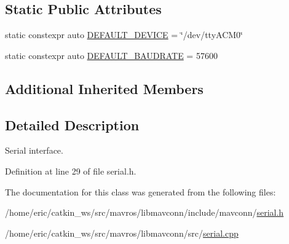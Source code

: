 \subsection*{Static Public Attributes}
\begin{DoxyCompactItemize}
\item 
static constexpr auto \mbox{\hyperlink{group__mavconn_ga3b2c35e0bfa1020060b2fde345d66f0e}{D\+E\+F\+A\+U\+L\+T\+\_\+\+D\+E\+V\+I\+CE}} = \char`\"{}/dev/tty\+A\+C\+M0\char`\"{}
\item 
static constexpr auto \mbox{\hyperlink{group__mavconn_gaf0dd28c4a6b236f2ec3092a1b35ff5df}{D\+E\+F\+A\+U\+L\+T\+\_\+\+B\+A\+U\+D\+R\+A\+TE}} = 57600
\end{DoxyCompactItemize}
\subsection*{Additional Inherited Members}


\subsection{Detailed Description}
Serial interface. 

Definition at line 29 of file serial.\+h.



The documentation for this class was generated from the following files\+:\begin{DoxyCompactItemize}
\item 
/home/eric/catkin\+\_\+ws/src/mavros/libmavconn/include/mavconn/\mbox{\hyperlink{serial_8h}{serial.\+h}}\item 
/home/eric/catkin\+\_\+ws/src/mavros/libmavconn/src/\mbox{\hyperlink{serial_8cpp}{serial.\+cpp}}\end{DoxyCompactItemize}
